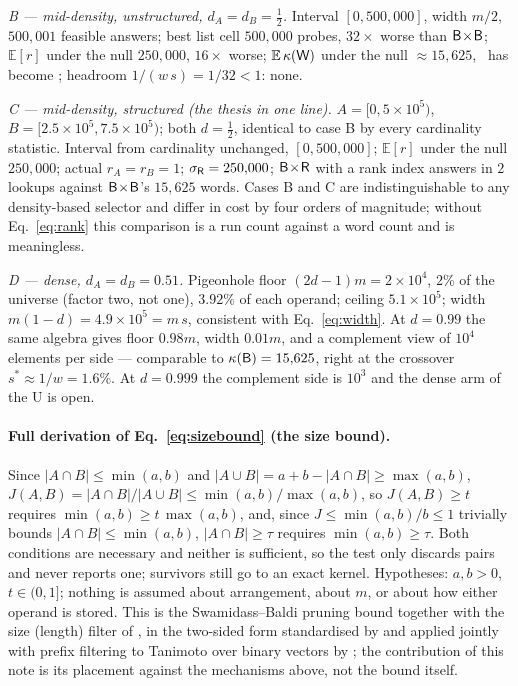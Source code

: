 \emph{B --- mid-density, unstructured, $d_A=d_B=\tfrac12$.} Interval $[0,500{,}000]$, width $m/2$,
$500{,}001$ feasible answers; best list cell $500{,}000$ probes, $32\times$ worse than
$\textsf{B}\!\times\!\textsf{B}$; $\mathbb{E}[r]$ under the null $250{,}000$, $16\times$ worse; $\mathbb{E}\,\kappa(\textsf{W})$
under the null $\approx15{,}625$, \rW\ has become \rB; headroom $1/(w\,s)=1/32<1$: none.

\emph{C --- mid-density, structured (the thesis in one line).} $A=[0,5\times10^5)$,
$B=[2.5\times10^5,7.5\times10^5)$; both $d=\tfrac12$, identical to case B by every cardinality
statistic. Interval from cardinality unchanged, $[0,500{,}000]$; $\mathbb{E}[r]$ under the null
$250{,}000$; actual $r_A=r_B=1$; $\sigma_{\textsf{R}}=250{,}000$; $\textsf{B}\!\times\!\textsf{R}$ with a rank index answers in
$2$ lookups against $\textsf{B}\!\times\!\textsf{B}$'s $15{,}625$ words. Cases B and C are indistinguishable to any
density-based selector and differ in cost by four orders of magnitude; without Eq.~\eqref{eq:rank} this
comparison is a run count against a word count and is meaningless.

\emph{D --- dense, $d_A=d_B=0.51$.} Pigeonhole floor $(2d-1)m=2\times10^4$, $2\%$ of the universe
(factor two, not one), $3.92\%$ of each operand; ceiling $5.1\times10^5$; width
$m(1-d)=4.9\times10^5=m\,s$, consistent with Eq.~\eqref{eq:width}. At $d=0.99$ the same algebra gives
floor $0.98m$, width $0.01m$, and a complement view of $10^4$ elements per side --- comparable to
$\kappa(\textsf{B})=15{,}625$, right at the crossover $s^*\approx1/w=1.6\%$. At $d=0.999$ the complement side
is $10^3$ and the dense arm of the U is open.

\paragraph*{Full derivation of Eq.~\eqref{eq:sizebound} (the size bound).}
Since $|A\cap B|\le\min(a,b)$ and $|A\cup B|=a+b-|A\cap B|\ge\max(a,b)$,
$J(A,B)=|A\cap B|/|A\cup B|\le\min(a,b)/\max(a,b)$, so $J(A,B)\ge t$ requires
$\min(a,b)\ge t\,\max(a,b)$, and, since $J\le\min(a,b)/b\le1$ trivially bounds $|A\cap B|\le\min(a,b)$,
$|A\cap B|\ge\tau$ requires $\min(a,b)\ge\tau$. Both conditions are necessary and neither is
sufficient, so the test only discards pairs and never reports one; survivors still go to an exact
kernel. Hypotheses: $a,b>0$, $t\in(0,1]$; nothing is assumed about arrangement, about $m$, or about how
either operand is stored. This is the Swamidass--Baldi pruning bound \cite{swamidass2007bounds}
together with the size (length) filter of
\cite{arasu2006exact}, in the two-sided form standardised by \cite{mann2016empirical} and applied
jointly with prefix filtering to Tanimoto over binary vectors by \cite{anastasiu2016tapnn}; the contribution of this note is its placement against the
mechanisms above, not the bound itself.

